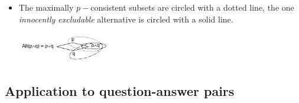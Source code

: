 \documentclass[landscape,cronos,paper=letter]{ling-handout}
\begin{document}
\begin{itemize}
    \item The maximally $p-$consistent subsets are circled with a dotted line, the one \textit{innocently excludable} alternative is circled with a solid line.

    \begin{center}
      \includegraphics[width=0.33\textwidth]{ie}
    \end{center}

   \end{itemize}

    \subsection*{Application to question-answer pairs}
\end{document}
